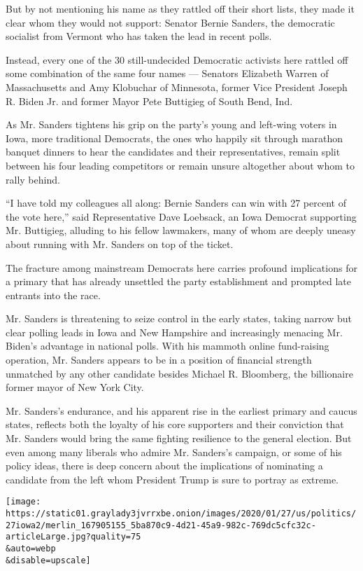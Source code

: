 But by not mentioning his name as they rattled off their short lists,
they made it clear whom they would not support: Senator Bernie Sanders,
the democratic socialist from Vermont who has taken the lead in recent
polls.

Instead, every one of the 30 still-undecided Democratic activists here
rattled off some combination of the same four names --- Senators
Elizabeth Warren of Massachusetts and Amy Klobuchar of Minnesota, former
Vice President Joseph R. Biden Jr. and former Mayor Pete Buttigieg of
South Bend, Ind.

As Mr. Sanders tightens his grip on the party's young and left-wing
voters in Iowa, more traditional Democrats, the ones who happily sit
through marathon banquet dinners to hear the candidates and their
representatives, remain split between his four leading competitors or
remain unsure altogether about whom to rally behind.

``I have told my colleagues all along: Bernie Sanders can win with 27
percent of the vote here,'' said Representative Dave Loebsack, an Iowa
Democrat supporting Mr. Buttigieg, alluding to his fellow lawmakers,
many of whom are deeply uneasy about running with Mr. Sanders on top of
the ticket.

The fracture among mainstream Democrats here carries profound
implications for a primary that has already unsettled the party
establishment and prompted late entrants into the race.

Mr. Sanders is threatening to seize control in the early states, taking
narrow but clear polling leads in Iowa and New Hampshire and
increasingly menacing Mr. Biden's advantage in national polls. With his
mammoth online fund-raising operation, Mr. Sanders appears to be in a
position of financial strength unmatched by any other candidate besides
Michael R. Bloomberg, the billionaire former mayor of New York City.

Mr. Sanders's endurance, and his apparent rise in the earliest primary
and caucus states, reflects both the loyalty of his core supporters and
their conviction that Mr. Sanders would bring the same fighting
resilience to the general election. But even among many liberals who
admire Mr. Sanders's campaign, or some of his policy ideas, there is
deep concern about the implications of nominating a candidate from the
left whom President Trump is sure to portray as extreme.

\texttt{[image: https://static01.graylady3jvrrxbe.onion/images/2020/01/27/us/politics/27iowa2/merlin\_167905155\_5ba870c9-4d21-45a9-982c-769dc5cfc32c-articleLarge.jpg?quality=75\\\&auto=webp\\\&disable=upscale]}

